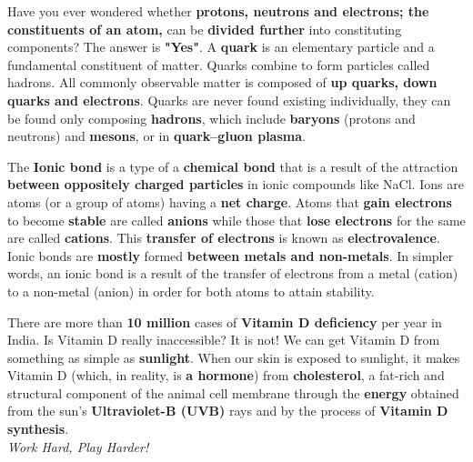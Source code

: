 \documentclass{article}
\begin{document}
\begin{phybox}
Have you ever wondered whether \textbf{protons, neutrons and electrons; the constituents of an atom,} can be \textbf{divided further} into constituting components? The answer is \textbf{"Yes"}. A \textbf{quark} is an elementary particle and a fundamental constituent of matter. Quarks combine to form particles called hadrons. All commonly observable matter is composed of \textbf{up quarks, down quarks and electrons}. Quarks are never found existing individually, they can be found only composing \textbf{hadrons}, which include \textbf{baryons} (protons and neutrons) and \textbf{mesons}, or in \textbf{quark–gluon plasma}.
\end{phybox}
\begin{chembox}
The \textbf{Ionic bond} is a type of a \textbf{chemical bond} that is a result of the attraction \textbf{between oppositely charged particles} in ionic compounds like NaCl. Ions are atoms (or a group of atoms) having a \textbf{net charge}. Atoms that \textbf{gain electrons} to become \textbf{stable} are called \textbf{anions} while those that \textbf{lose electrons} for the same are called \textbf{cations}. This \textbf{transfer of electrons} is known as \textbf{electrovalence}. Ionic bonds are \textbf{mostly} formed \textbf{between metals and non-metals}. In simpler words, an ionic bond is a result of the transfer of electrons from a metal (cation) to a non-metal (anion) in order for both atoms to attain stability.
\end{chembox}
\begin{biobox}
There are more than \textbf{10 million} cases of \textbf{Vitamin D deficiency} per year in India. Is Vitamin D really inaccessible? It is not! We can get Vitamin D from something as simple as \textbf{sunlight}. When our skin is exposed to sunlight, it makes Vitamin D (which, in reality, is \textbf{a hormone}) from \textbf{cholesterol}, a fat-rich and structural component of the animal cell membrane through the \textbf{energy} obtained from the sun’s \textbf{Ultraviolet-B (UVB)} rays and by the process of \textbf{Vitamin D synthesis}.\\
\textit{Work Hard, Play Harder!}
\end{biobox} 
\end{document}
